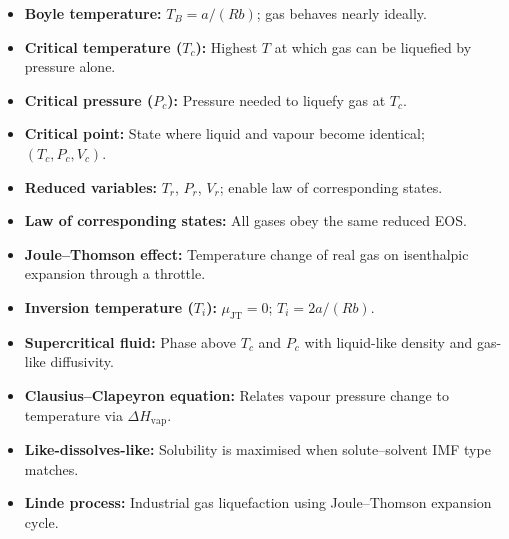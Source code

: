 \documentclass[12pt,a4paper]{article}
\begin{document}
\begin{tcolorbox}[defbox, title={One-Line Definitions}]
\begin{itemize}[leftmargin=*, itemsep=2pt, topsep=2pt]
  \item \textbf{Boyle temperature:} $T_B = a/(Rb)$; gas behaves nearly ideally.
  \item \textbf{Critical temperature ($T_c$):} Highest $T$ at which gas can be liquefied by pressure alone.
  \item \textbf{Critical pressure ($P_c$):} Pressure needed to liquefy gas at $T_c$.
  \item \textbf{Critical point:} State where liquid and vapour become identical; $(T_c, P_c, V_c)$.
  \item \textbf{Reduced variables:} $T_r$, $P_r$, $V_r$; enable law of corresponding states.
  \item \textbf{Law of corresponding states:} All gases obey the same reduced EOS.
  \item \textbf{Joule--Thomson effect:} Temperature change of real gas on isenthalpic expansion through a throttle.
  \item \textbf{Inversion temperature ($T_i$):} $\mu_{\mathrm{JT}} = 0$; $T_i = 2a/(Rb)$.
  \item \textbf{Supercritical fluid:} Phase above $T_c$ and $P_c$ with liquid-like density and gas-like diffusivity.
  \item \textbf{Clausius--Clapeyron equation:} Relates vapour pressure change to temperature via $\Delta H_{\mathrm{vap}}$.
  \item \textbf{Like-dissolves-like:} Solubility is maximised when solute--solvent IMF type matches.
  \item \textbf{Linde process:} Industrial gas liquefaction using Joule--Thomson expansion cycle.
\end{itemize}
\end{tcolorbox}
\end{document}
